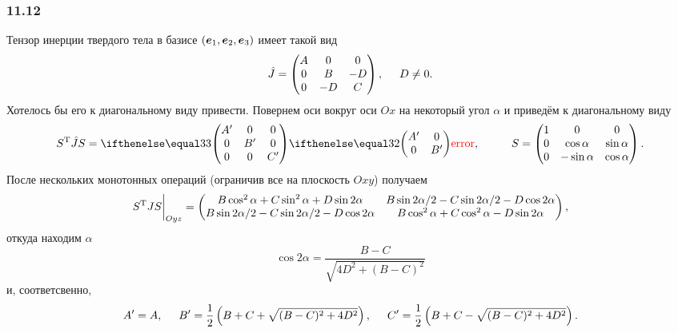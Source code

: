 \subsubsection*{11.12}
Тензор инерции твердого тела в базисе $(\mbox{\boldmath $e$}_1, \mbox{\boldmath $e$}_2, \mbox{\boldmath $e$}_3)$ имеет такой вид
\begin{equation*}
    \hat{J} = \begin{pmatrix}
        A & 0 & 0 \\
        0 & B & -D \\
        0 & -D & C \\
    \end{pmatrix}, \hspace{0.5cm} D \neq 0.
\end{equation*}
Хотелось бы его к диагональному виду привести. 
Повернем оси вокруг оси $Ox$ на некоторый угол $\alpha$ и приведём к диагональному виду
\begin{equation*}
    S\T \hat{J} S = \dmat{3}{A'}{B'}{C'}, \hspace{1cm} 
    S = \begin{pmatrix}
        1 & 0 & 0 \\
        0 & \cos \alpha & \sin \alpha \\
        0 & -\sin \alpha & \cos \alpha \\
    \end{pmatrix}.
\end{equation*}
После нескольких монотонных операций (ограничив все на плоскость $Oxy$) получаем
\begin{equation*}
    S^{\text{T}} J S \bigg|_{Oyz} = 
    \begin{pmatrix}
            B \cos ^2 \alpha + C \sin^2 \alpha + D \sin 2\alpha &
            B \sin 2 \alpha / 2 - C \sin 2 \alpha / 2 - D \cos 2 \alpha \\
            B \sin 2 \alpha / 2 - C \sin 2 \alpha / 2 - D \cos 2 \alpha &
            B \cos ^2 \alpha + C \cos^2 \alpha - D \sin 2\alpha \\
    \end{pmatrix},
\end{equation*}
откуда находим $\alpha$ 
\begin{equation*}
    \cos 2\alpha = \frac{B-C}{\sqrt{4D^2+(B-C)^2}}
\end{equation*}
и, соответсвенно,
\begin{equation}
    A' = A, \hspace{0.5cm} 
    B' = \frac{1}{2} \left(
        B + C + \sqrt{(B-C)^2+4D^2}
    \right), \hspace{0.5cm} 
    C' = \frac{1}{2} \left(
        B + C - \sqrt{(B-C)^2+4D^2}
    \right).
\end{equation}
